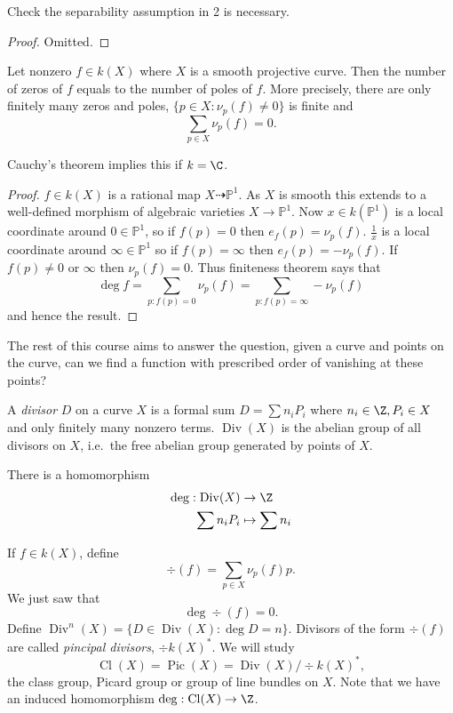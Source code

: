 \documentclass[a4paper]{article}
\DeclareMathOperator{\Cl}{Cl}
\renewcommand*{\P}{\mathbb{P}}
\newcommand{\rational}{\dashrightarrow} %
\DeclareMathOperator{\Div}{Div} %
\begin{document}
\begin{ex}
  Check the separability assumption in 2 is necessary.
\end{ex}

\begin{proof}
  Omitted.
\end{proof}

\begin{corollary}
  Let nonzero \(f \in k(X)\) where \(X\) is a smooth projective curve. Then the number of zeros of \(f\) equals to the number of poles of \(f\). More precisely, there are only finitely many zeros and poles, \(\{p \in X: \nu_p(f) \neq 0\}\) is finite and
  \[
    \sum_{p \in X} \nu_p(f) = 0.
  \]
\end{corollary}
Cauchy's theorem implies this if \(k = \C\).

\begin{proof}
  \(f \in k(X)\) is a rational map \(X \rational \P^1\). As \(X\) is smooth this extends to a well-defined morphism of algebraic varieties \(X \to \P^1\). Now \(x \in k(\P^1)\) is a local coordinate around \(0 \in \P^1\), so if \(f(p) = 0\) then \(e_f(p) = \nu_p(f)\). \(\frac{1}{x}\) is a local coordinate around \(\infty \in \P^1\) so if \(f(p) = \infty\) then \(e_f(p) = - \nu_p(f)\). If \(f(p) \neq 0\) or \(\infty\) then \(\nu_p(f) = 0\). Thus finiteness theorem says that
  \[
    \deg f = \sum_{p: f(p) = 0} \nu_p(f) = \sum_{p: f(p) = \infty} - \nu_p(f)
  \]
  and hence the result.
\end{proof}

The rest of this course aims to answer the question, given a curve and points on the curve, can we find a function with prescribed order of vanishing at these points?

\begin{definition}[divisor]
  A \emph{divisor} \(D\) on a curve \(X\) is a formal sum \(D = \sum n_i P_i\) where \(n_i \in \Z, P_i \in X\) and only finitely many nonzero terms. \(\Div (X)\) is the abelian group of all divisors on \(X\), i.e.\ the free abelian group generated by points of \(X\).
\end{definition}

There is a homomorphism
\begin{align*}
  \deg: \Div(X) &\to \Z \\
  \sum n_i P_i &\mapsto \sum n_i
\end{align*}

If \(f \in k(X)\), define
\[
  \div(f) =  \sum_{p \in X} \nu_p(f) p.
\]
We just saw that
\[
  \deg \div (f) = 0.
\]
Define \(\Div^n(X) = \{D \in \Div(X): \deg D = n\}\). Divisors of the form \(\div (f)\) are called \emph{pincipal divisors}, \(\div k(X)^*\). We will study
\[
  \Cl (X) = \operatorname{Pic} (X) = \Div(X) / \div k(X)^*,
\]
the class group, Picard group or group of line bundles on \(X\). Note that we have an induced homomorphism \(\deg: \Cl (X) \to \Z\).
\end{document}
